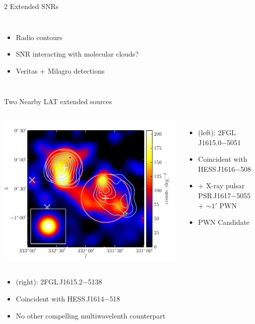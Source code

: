 \documentclass[12pt]{beamer}
\begin{document}
\begin{frame}{2 Extended SNRs}
\begin{columns}
    \begin{itemize}
      \item Radio contours
      \item SNR interacting with molecular clouds?
      \item Veritas + Milagro detections
      \end{itemize}
  \end{columns}
\end{frame}


\begin{frame}{Two Nearby LAT extended sources}


  \begin{columns}
    \includegraphics[scale=0.5]{plots/source_HESS_J1614-518_color.pdf}
    \begin{itemize}
    \item (left): 
      2FGL\,J1615.0$-$5051
    \item Coincident with HESS\,J1616$-$508
    \item + X-ray pulsar
PSR\,J1617$-$5055 + $\sim 1'$ PWN 
    \item PWN Candidate
    \end{itemize}
  \end{columns}

  \begin{itemize}
    \item (right):
      2FGL\,J1615.2$-$5138 
    \item Coincident with HESS\,J1614$-$518
    \item No other compelling multiwavelenth counterpart
  \end{itemize}
\end{frame}
\end{document}
